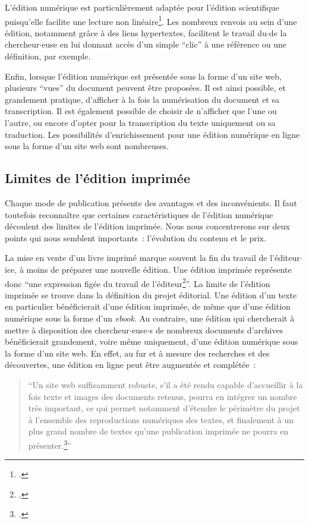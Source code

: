 \bigskip
\bigskip
\bigskip
\bigskip
L'édition numérique est particulièrement adaptée pour l'édition scientifique puisqu'elle facilite une lecture non linéaire\footcite[p.~179]{Clavaud2015}. Les nombreux renvois au sein d'une édition, notamment grâce à des liens hypertextes,  facilitent le travail du$\cdot$de la chercheur$\cdot$euse en lui donnant accès d'un simple \enquote{clic} à une référence ou une définition, par exemple.  

Enfin, lorsque l'édition numérique est présentée sous la forme d'un site web, plusieurs \enquote{vues} du document peuvent être proposées. Il est ainsi possible, et grandement pratique, d'afficher à la fois la numérisation du document et sa transcription. Il est également possible de choisir de n'afficher que l'une ou l'autre, ou encore d'opter pour la transcription du texte uniquement ou sa traduction. Les possibilités d'enrichissement pour une édition numérique en ligne sous la forme d'un site web sont nombreuses.


\subsection{Limites de l'édition imprimée}
Chaque mode de publication présente des avantages et des inconvénients. Il faut toutefois reconnaître que certaines caractéristiques de l'édition numérique découlent des limites de l'édition imprimée. Nous nous concentrerons sur deux points qui nous semblent importants~: l'évolution du contenu et le prix.  

La mise en vente d'un livre imprimé marque souvent la fin du travail de l'éditeur$\cdot$ice, à moins de préparer une nouvelle édition. Une édition imprimée représente donc \enquote{une expression figée du travail de l'éditeur\footcite[p.~177]{Clavaud2015}}. La limite de l'édition imprimée se trouve dans la définition du projet éditorial. Une édition d'un texte en particulier bénéficierait d'une édition imprimée, de même que d'une édition numérique sous la forme d'un \textit{ebook}. Au contraire, une édition qui chercherait à mettre à disposition des chercheur$\cdot$euse$\cdot$s de nombreux documents d'archives bénéficierait grandement, voire même uniquement, d'une édition numérique sous la forme d'un site web. En effet, au fur et à mesure des recherches et des découvertes, une édition en ligne peut être augmentée et complétée~:

\begin{quote}
    \enquote{Un site web suffisamment robuste, s'il a été rendu capable d'accueillir à la fois texte et images des documents retenus, pourra en intégrer un nombre très important, ce qui permet notamment d'étendre le périmètre du projet à l'ensemble des reproductions numériques des textes, et finalement à un plus grand nombre de textes qu'une publication imprimée ne pourra en présenter.\footcite[p.~176-177]{Clavaud2015}}
\end{quote}

